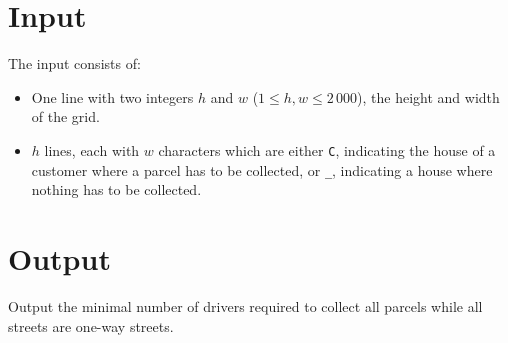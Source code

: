 \section*{Input}
The input consists of:
\begin{itemize}
	\item One line with two integers $h$ and $w$ ($1 \le h,w \le 2\,000$),
		the height and width of the grid.
	\item $h$ lines, each with $w$ characters which are either
		\texttt{C}, indicating the house of a customer where a parcel has to 
		be collected, or \texttt{\_}, indicating a house where nothing has 
		to be collected.
\end{itemize}

\section*{Output}
Output the minimal number of drivers required to collect all parcels 
while all streets are one-way streets.
